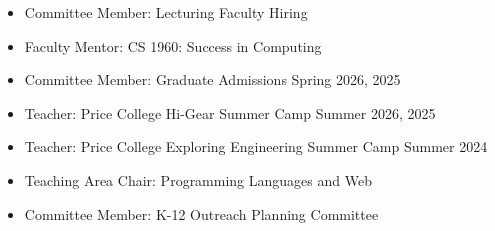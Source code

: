 \documentclass[11pt]{article}
\begin{document}

\begin{itemize}
  \item Committee Member: Lecturing Faculty Hiring  \hfill {}
  \item Faculty Mentor: CS 1960: Success in Computing \hfill {}
  \item Committee Member: {Graduate Admissions} \hfill Spring 2026, 2025
  \item Teacher: Price College Hi-Gear Summer Camp \hfill Summer 2026, 2025
  \item Teacher: Price College Exploring Engineering Summer Camp \hfill Summer 2024
  \item Teaching Area Chair: {Programming Languages and Web} \hfill {}
  \item Committee Member: {K-12 Outreach Planning Committee} \hfill {}
\end{itemize}


\end{document}
